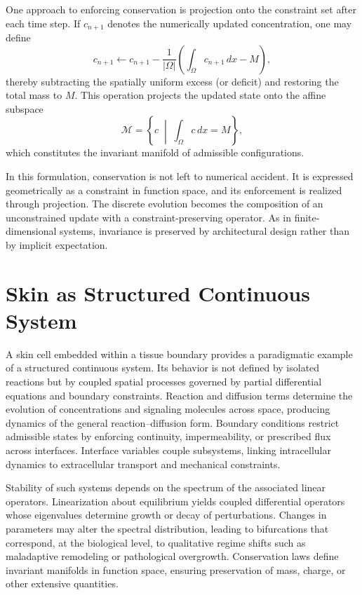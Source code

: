 \documentclass[12pt]{book}
\begin{document}
One approach to enforcing conservation is projection onto the
constraint set after each time step. If $c_{n+1}$ denotes the
numerically updated concentration, one may define
\[
c_{n+1}
\leftarrow
c_{n+1}
-
\frac{1}{|\Omega|}
\left(
\int_\Omega c_{n+1}\, dx - M
\right),
\]
thereby subtracting the spatially uniform excess (or deficit) and
restoring the total mass to $M$. This operation projects the updated
state onto the affine subspace
\[
\mathcal{M}
=
\left\{
c \;\middle|\;
\int_\Omega c\, dx = M
\right\},
\]
which constitutes the invariant manifold of admissible configurations.

In this formulation, conservation is not left to numerical accident.
It is expressed geometrically as a constraint in function space, and
its enforcement is realized through projection. The discrete
evolution becomes the composition of an unconstrained update with a
constraint-preserving operator. As in finite-dimensional systems,
invariance is preserved by architectural design rather than by
implicit expectation.

\section{Skin as Structured Continuous System}

A skin cell embedded within a tissue boundary provides a paradigmatic
example of a structured continuous system. Its behavior is not defined
by isolated reactions but by coupled spatial processes governed by
partial differential equations and boundary constraints. Reaction and
diffusion terms determine the evolution of concentrations and signaling
molecules across space, producing dynamics of the general
reaction--diffusion form. Boundary conditions restrict admissible
states by enforcing continuity, impermeability, or prescribed flux
across interfaces. Interface variables couple subsystems, linking
intracellular dynamics to extracellular transport and mechanical
constraints.

Stability of such systems depends on the spectrum of the associated
linear operators. Linearization about equilibrium yields coupled
differential operators whose eigenvalues determine growth or decay of
perturbations. Changes in parameters may alter the spectral
distribution, leading to bifurcations that correspond, at the
biological level, to qualitative regime shifts such as maladaptive
remodeling or pathological overgrowth. Conservation laws define
invariant manifolds in function space, ensuring preservation of mass,
charge, or other extensive quantities.
\end{document}
